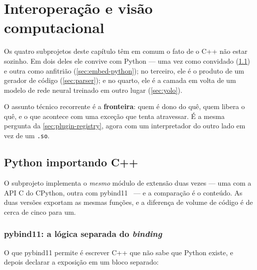 
\section{Interoperação e visão computacional}
\label{sec:interop}

Os quatro subprojetos deste capítulo têm em comum o fato de o C++ não estar
sozinho. Em dois deles ele convive com Python --- uma vez como convidado
(\ref{sec:python}) e outra como anfitrião (\ref{sec:embed-python}); no terceiro,
ele é o produto de um gerador de código (\ref{sec:parser}); e no quarto, ele é a
camada em volta de um modelo de rede neural treinado em outro lugar
(\ref{sec:yolo}).

O assunto técnico recorrente é a \textbf{fronteira}: quem é dono do quê, quem
libera o quê, e o que acontece com uma exceção que tenta atravessar. É a mesma
pergunta da \cref{sec:plugin-registry}, agora com um interpretador do outro lado
em vez de um \texttt{.so}.

\subsection{Python importando C++}
\label{sec:python}

O subprojeto  implementa o \emph{mesmo} módulo de extensão duas
vezes --- uma com a API C do CPython, outra com pybind11~\cite{pybind11} --- e a
comparação é o conteúdo. As duas versões exportam as mesmas funções, e a
diferença de volume de código é de cerca de cinco para um.

\subsubsection{pybind11: a lógica separada do \emph{binding}}

O que pybind11 permite é escrever C++ que não sabe que Python existe, e depois
declarar a exposição em um bloco separado:

